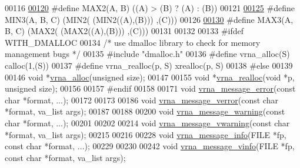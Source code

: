 \begin{DoxyCode}
00116 
\mbox{\hyperlink{group__utils_ga33297b3679c713b0c4d897cd0fe3b122}{00120}} \textcolor{preprocessor}{#define MAX2(A, B)      ((A) > (B) ? (A) : (B))}
00121 
\mbox{\hyperlink{group__utils_ga721b8d5f3abef17f10293f1f7f8c958e}{00125}} \textcolor{preprocessor}{#define MIN3(A, B, C)   (MIN2(  (MIN2((A),(B))) ,(C)))}
00126 
\mbox{\hyperlink{group__utils_ga8d577123d2e66d2b7d0bf9af6e172b93}{00130}} \textcolor{preprocessor}{#define MAX3(A, B, C)   (MAX2(  (MAX2((A),(B))) ,(C)))}
00131 
00132 
00133 \textcolor{preprocessor}{#ifdef WITH\_DMALLOC}
00134 \textcolor{comment}{/* use dmalloc library to check for memory management bugs */}
00135 \textcolor{preprocessor}{#include "dmalloc.h"}
00136 \textcolor{preprocessor}{#define vrna\_alloc(S)       calloc(1,(S))}
00137 \textcolor{preprocessor}{#define vrna\_realloc(p, S)  xrealloc(p, S)}
00138 \textcolor{preprocessor}{#else}
00139 
00146 \textcolor{keywordtype}{void}  *\mbox{\hyperlink{group__utils_gaf37a0979367c977edfb9da6614eebe99}{vrna\_alloc}}(\textcolor{keywordtype}{unsigned} size);
00147 
00155 \textcolor{keywordtype}{void}  *\mbox{\hyperlink{group__utils_ga27f4719a66c6f90d1cca3d1e6e696c6a}{vrna\_realloc}}(\textcolor{keywordtype}{void} *p, \textcolor{keywordtype}{unsigned} size);
00156 
00157 \textcolor{preprocessor}{#endif}
00158 
00171 \textcolor{keywordtype}{void} \mbox{\hyperlink{group__utils_ga36b35be01d7f36cf7f59c245eee628d1}{vrna\_message\_error}}(\textcolor{keyword}{const} \textcolor{keywordtype}{char} *format, ...);
00172 
00173 
00186 \textcolor{keywordtype}{void} \mbox{\hyperlink{group__utils_gabc1a08dea0d84b5c33701732172a8b18}{vrna\_message\_verror}}(\textcolor{keyword}{const} \textcolor{keywordtype}{char} *format, va\_list args);
00187 
00188 
00200 \textcolor{keywordtype}{void} \mbox{\hyperlink{group__utils_ga6e07ed24add60693ba886d54d0a46635}{vrna\_message\_warning}}(\textcolor{keyword}{const} \textcolor{keywordtype}{char} *format, ...);
00201 
00202 
00214 \textcolor{keywordtype}{void} \mbox{\hyperlink{group__utils_ga377aa8ec8a49d343063adb22e6311f26}{vrna\_message\_vwarning}}(\textcolor{keyword}{const} \textcolor{keywordtype}{char} *format, va\_list args);
00215 
00216 
00228 \textcolor{keywordtype}{void} \mbox{\hyperlink{group__utils_ga039bae6153a6415b054dbe6045f83d03}{vrna\_message\_info}}(FILE *fp, \textcolor{keyword}{const} \textcolor{keywordtype}{char} *format, ...);
00229 
00230 
00242 \textcolor{keywordtype}{void} \mbox{\hyperlink{group__utils_gad8b8139bd04fbfb51e398e9fcd6908dc}{vrna\_message\_vinfo}}(FILE *fp, \textcolor{keyword}{const} \textcolor{keywordtype}{char} *format, va\_list args);

\end{DoxyCode}
